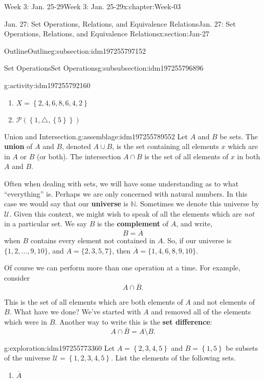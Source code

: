 \documentclass[oneside,10pt,]{book}
\newcommand{\terminology}[1]{\textbf{#1}}
\numberwithin{equation}{section}
\newcommand{\set}[1]{\left\{ {#1} \right\}}
\def\N{{\mathbb N}}
\def\U{{\mathcal U}}
\def\pow{{\mathcal P}}
\newcommand{\N}{\mathbb N}
\newcommand{\U}{\mathcal U}
\newcommand{\pow}{\mathcal P}
\renewcommand{\bar}{\overline}
\begin{document}
\begin{chapterptx}{Week 3: Jan. 25-29}{}{Week 3: Jan. 25-29}{}{}{x:chapter:Week-03}
\begin{sectionptx}{Jan. 27: Set Operations, Relations, and Equivalence Relations}{}{Jan. 27: Set Operations, Relations, and Equivalence Relations}{}{}{x:section:Jan-27}
\begin{subsectionptx}{Outline}{}{Outline}{}{}{g:subsection:idm197255797152}
\begin{subsubsectionptx}{Set Operations}{}{Set Operations}{}{}{g:subsubsection:idm197255796896}
\begin{activity}{}{g:activity:idm197255792160}
\begin{enumerate}
\item{}\(\displaystyle X = \set{2, 4, 6, 8, 6, 4, 2}\)%
\item{}\(\displaystyle \pow(\set{1,\triangle,\set{5}})\)%
\end{enumerate}
\end{activity}%
\begin{assemblage}{Union and Intersection.}{g:assemblage:idm197255789552}%
Let \(A\) and \(B\) be sets. The \terminology{union} of \(A\) and \(B\), denoted \(A\cup B\), is the set containing all elements \(x\) which are in \(A\) or \(B\) (or both). The intersection \(A\cap B\) is the set of all elements of \(x\) in both \(A\) and \(B\).%
\end{assemblage}
Often when dealing with sets, we will have some understanding as to what ``everything'' is. Perhaps we are only concerned with natural numbers. In this case we would say that our \terminology{universe} is \(\N\).  Sometimes we denote this universe by \(\U\). Given this context, we might wish to speak of all the elements which are \emph{not} in a particular set. We say \(B\) is the \terminology{complement}  of \(A\), and write,%
\begin{equation*}
B = \bar A
\end{equation*}
when \(B\) contains every element not contained in \(A\). So, if our universe is \(\{1, 2,\ldots, 9, 10\}\), and \(A = \{2, 3, 5, 7\}\), then \(\bar A = \{1, 4, 6, 8, 9,10\}\).%
\par
Of course we can perform more than one operation at a time. For example, consider%
\begin{equation*}
A \cap \bar B\text{.}
\end{equation*}
%
\par
This is the set of all elements which are both elements of \(A\) and not elements of \(B\). What have we done? We've started with \(A\) and removed all of the elements which were in \(B\). Another way to write this is the \terminology{set difference}: %
\begin{equation*}
A \cap \bar B = A \setminus B\text{.}
\end{equation*}
%
\begin{exploration}{}{g:exploration:idm197255773360}%
Let \(A = \set{2,3,4,5}\) and \(B=\set{1,5}\) be subsets of the universe \(\mathcal{U} = \set{1,2,3,4,5}\). List the elements of the following sets.%
%
\begin{enumerate}
\item{}\(\displaystyle {\bar A}\)%

\end{enumerate}
\end{exploration}
\end{subsubsectionptx}
\end{subsectionptx}
\end{sectionptx}
\end{chapterptx}
\end{document}
